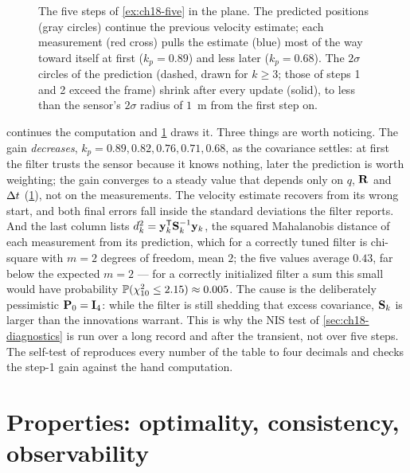 \begin{figure}[tb]
  \centering
  \caption{The five steps of \cref{ex:ch18-five} in the plane. The predicted
  positions (gray circles) continue the previous velocity estimate; each
  measurement (red cross) pulls the estimate (blue) most of the way toward
  itself at first ($k_p=0.89$) and less later ($k_p=0.68$). The $2\sigma$
  circles of the prediction (dashed, drawn for $k\ge3$; those of steps 1 and
  2 exceed the frame) shrink after every update (solid), to less than the
  sensor's $2\sigma$ radius of $1$~m from the first step on.}
  \label{fig:ch18-example}
\end{figure}

 continues the computation and \cref{fig:ch18-example}
draws it. Three things are worth noticing. The gain \emph{decreases},
$k_p=0.89,0.82,0.76,0.71,0.68$, as the covariance settles: at first the filter
trusts the sensor because it knows nothing, later the prediction is worth
weighting; the gain converges to a steady value that depends only on $q$,
$\mathbf{R}$ and $\Delta t$ (\cref{sec:ch18-properties}), not on the measurements.
The velocity estimate recovers from its wrong start, and both final errors
fall inside the standard deviations the filter reports. And the last column
lists
$d^2_k=\mathbf{y}_k^{\mathsf{T}}\mathbf{S}_k^{-1}\mathbf{y}_k$, the squared Mahalanobis distance
of each measurement from its prediction, which for a correctly tuned filter
is chi-square with $m=2$ degrees of freedom, mean $2$; the five values average
$0.43$, far below the expected $m=2$ --- for a correctly initialized filter a
sum this small would have probability $\mathbb{P}(\chi^2_{10}\le2.15)\approx0.005$.
The cause is the deliberately pessimistic $\mathbf{P}_0=\mathbf{I}_4$: while the
filter is still shedding that excess covariance, $\mathbf{S}_k$ is larger than
the innovations warrant. This is why the NIS test of
\cref{sec:ch18-diagnostics} is run over a long record and after the
transient, not over five steps. The self-test of  reproduces every number
of the table to four decimals and checks the step-1 gain against the hand
computation.

\section{Properties: optimality, consistency, observability}
\label{sec:ch18-properties}


